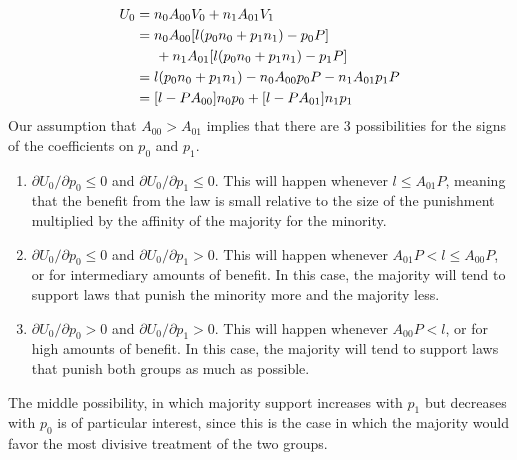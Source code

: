 \begin{align}
\nonumber U_0 &= n_0 A_{00}  V_0 + n_1 A_{01}  V_1 \\
\nonumber &= n_0 A_{00}  [l (p_0 n_0 + p_1 n_1) - p_0 P] \\
\nonumber &\hspace{.5cm} + n_1 A_{01}  [l (p_0 n_0 + p_1 n_1) - p_1P] \\
\nonumber &= l (p_0 n_0 + p_1 n_1)  - n_0 A_{00}p_0 P - n_1 A_{01}  p_1 P \\
&=   [ l  -  P A_{00} ]n_0 p_0  + [l - P A_{01}] n_1 p_1  
\end{align}
%
%
%
Our assumption that $A_{00} > A_{01}$ %
implies that there are 3 possibilities for the signs of the coefficients on $p_0$ and $p_1$.

\begin{enumerate}
\item $\partial U_0 / \partial p_0 \leq 0$ and $\partial U_0 / \partial p_1 \leq 0$.  This will happen whenever $l \leq   A_{01}P $, meaning that the benefit from the law is small relative to the size of the punishment multiplied by the affinity of the majority for the minority.
\item $\partial U_0 / \partial p_0 \leq 0$ and $\partial U_0 / \partial p_1 > 0$.  This will happen whenever $  A_{01}P < l  \leq A_{00}P $, or for intermediary amounts of benefit.  In this case, the majority will tend to support laws that punish the minority more and the majority less.
\item $\partial U_0 / \partial p_0 > 0$ and $\partial U_0 / \partial p_1 > 0$.  This will happen whenever $   A_{00}P < l$, or for high amounts of benefit.  In this case, the majority will tend to support laws that punish both groups as much as possible.
\end{enumerate}

The middle possibility, in which majority support increases with $p_1$ but decreases with $p_0$ is of particular interest, since this is the case in which the majority would favor the most divisive treatment of the two groups.

%

